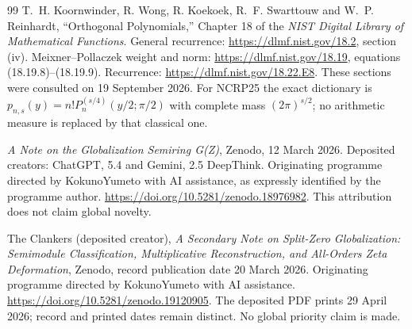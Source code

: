 \begin{thebibliography}{99}
T.~H. Koornwinder, R. Wong, R. Koekoek, R.~F. Swarttouw and
W.~P. Reinhardt, ``Orthogonal Polynomials,'' Chapter 18 of the
\emph{NIST Digital Library of Mathematical Functions}.
General recurrence: \url{https://dlmf.nist.gov/18.2}, section (iv).
Meixner--Pollaczek weight and norm:
\url{https://dlmf.nist.gov/18.19}, equations (18.19.8)--(18.19.9).
Recurrence: \url{https://dlmf.nist.gov/18.22.E8}.
These sections were consulted on 19 September 2026.
For NCRP25 the exact dictionary is
$p_{n,s}(y)=n!P_n^{(s/4)}(y/2;\pi/2)$ with complete mass
$(2\pi)^{s/2}$; no arithmetic measure is replaced by that classical one.

\emph{A Note on the Globalization Semiring G(Z)}, Zenodo,
12 March 2026. Deposited creators: ChatGPT, 5.4 and Gemini, 2.5 DeepThink.
Originating programme directed by KokunoYumeto with AI assistance,
as expressly identified by the programme author.
\url{https://doi.org/10.5281/zenodo.18976982}.
This attribution does not claim global novelty.

The Clankers (deposited creator), \emph{A Secondary Note on Split-Zero
Globalization: Semimodule Classification, Multiplicative Reconstruction,
and All-Orders Zeta Deformation}, Zenodo, record publication date
20 March 2026. Originating programme directed by KokunoYumeto
with AI assistance. \url{https://doi.org/10.5281/zenodo.19120905}.
The deposited PDF prints 29 April 2026; record and printed dates
remain distinct. No global priority claim is made.
\end{thebibliography}
